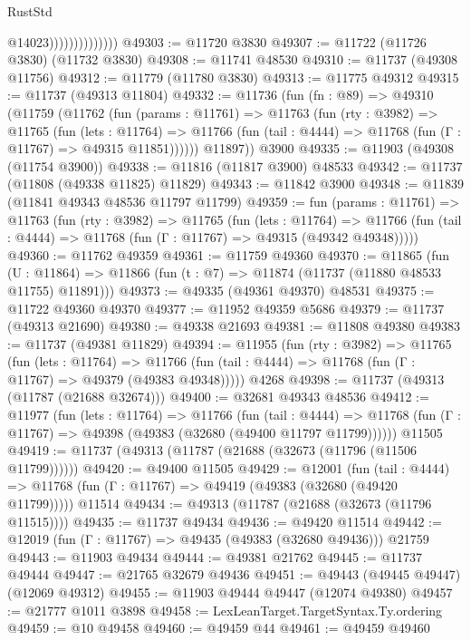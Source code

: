 \begin{lexlean}{RustStd}
\begin{coremodule}
                                @14023))))))))))))))
@49303 := @11720 @3830
@49307 := @11722 (@11726 @3830) (@11732 @3830)
@49308 := @11741 @48530
@49310 := @11737 (@49308 @11756)
@49312 := @11779 (@11780 @3830)
@49313 := @11775 @49312
@49315 := @11737 (@49313 @11804)
@49332 := @11736
    (fun (fn : @89) =>
    @49310
      (@11759
        (@11762
          (fun (params : @11761) =>
          @11763
            (fun (rty : @3982) =>
            @11765
              (fun (lets : @11764) =>
              @11766 (fun (tail : @4444) => @11768 (fun (Γ : @11767) => @49315 @11851))))))
        @11897))
    @3900
@49335 := @11903 (@49308 (@11754 @3900))
@49338 := @11816 (@11817 @3900) @48533
@49342 := @11737 (@11808 (@49338 @11825) @11829)
@49343 := @11842 @3900
@49348 := @11839 (@11841 @49343 @48536 @11797 @11799)
@49359 := fun (params : @11761) =>
  @11763
    (fun (rty : @3982) =>
    @11765
      (fun (lets : @11764) =>
      @11766 (fun (tail : @4444) => @11768 (fun (Γ : @11767) => @49315 (@49342 @49348)))))
@49360 := @11762 @49359
@49361 := @11759 @49360
@49370 := @11865
    (fun (U : @11864) => @11866 (fun (t : @7) => @11874 (@11737 (@11880 @48533 @11755) @11891)))
@49373 := @49335 (@49361 @49370) @48531
@49375 := @11722 @49360 @49370
@49377 := @11952 @49359 @5686
@49379 := @11737 (@49313 @21690)
@49380 := @49338 @21693
@49381 := @11808 @49380
@49383 := @11737 (@49381 @11829)
@49394 := @11955
    (fun (rty : @3982) =>
    @11765
      (fun (lets : @11764) =>
      @11766 (fun (tail : @4444) => @11768 (fun (Γ : @11767) => @49379 (@49383 @49348)))))
    @4268
@49398 := @11737 (@49313 (@11787 (@21688 @32674)))
@49400 := @32681 @49343 @48536
@49412 := @11977
    (fun (lets : @11764) =>
    @11766
      (fun (tail : @4444) =>
      @11768 (fun (Γ : @11767) => @49398 (@49383 (@32680 (@49400 @11797 @11799))))))
    @11505
@49419 := @11737 (@49313 (@11787 (@21688 (@32673 (@11796 (@11506 @11799))))))
@49420 := @49400 @11505
@49429 := @12001
    (fun (tail : @4444) => @11768 (fun (Γ : @11767) => @49419 (@49383 (@32680 (@49420 @11799)))))
    @11514
@49434 := @49313 (@11787 (@21688 (@32673 (@11796 @11515))))
@49435 := @11737 @49434
@49436 := @49420 @11514
@49442 := @12019 (fun (Γ : @11767) => @49435 (@49383 (@32680 @49436))) @21759
@49443 := @11903 @49434
@49444 := @49381 @21762
@49445 := @11737 @49444
@49447 := @21765 @32679 @49436
@49451 := @49443 (@49445 @49447) (@12069 @49312)
@49455 := @11903 @49444 @49447 (@12074 @49380)
@49457 := @21777 @1011 @3898
@49458 := LexLeanTarget.TargetSyntax.Ty.ordering
@49459 := @10 @49458
@49460 := @49459 @44
@49461 := @49459 @49460

\end{coremodule}
\end{lexlean}
